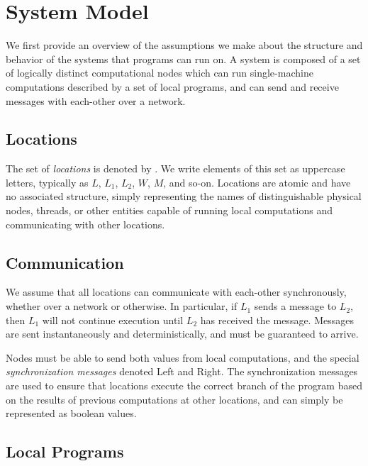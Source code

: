 \section{System Model}
\label{sec:system_model}

We first provide an overview of the assumptions we make about the structure and behavior of the systems that \langname{} programs can run on.
A system is composed of a set of logically distinct computational nodes which can run single-machine computations described by a set of local programs, and can send and receive messages with each-other over a network.

\subsection{Locations}
\label{sec:locations}

The set of \emph{locations} is denoted by \Locations.
We write elements of this set as uppercase letters, typically as $L$, $L_1$, $L_2$, $W$, $M$, and so-on.
Locations are atomic and have no associated structure, simply representing the names of distinguishable physical nodes, threads, or other entities capable of running local computations and communicating with other locations.

\subsection{Communication}
\label{sec:communication}

We assume that all locations can communicate with each-other synchronously, whether over a network or otherwise.
In particular, if $L_1$ sends a message to $L_2$, then $L_1$ will not continue execution until $L_2$ has received the message.
Messages are sent instantaneously and deterministically, and must be guaranteed to arrive.

Nodes must be able to send both values from local computations, and the special \emph{synchronization messages} denoted \textsf{Left} and \textsf{Right}.
The synchronization messages are used to ensure that locations execute the correct branch of the program based on the results of previous computations at other locations, and can simply be represented as boolean values.

\subsection{Local Programs}
\label{sec:local-programs}

